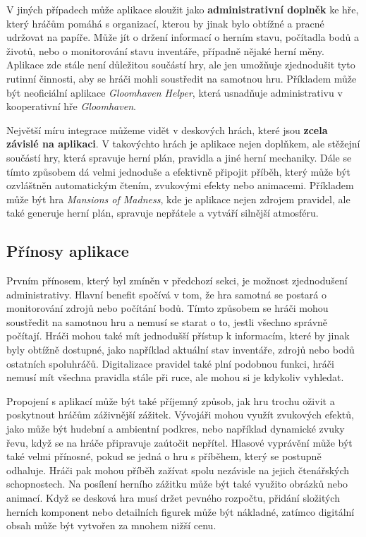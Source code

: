 V jiných případech může aplikace sloužit jako \textbf{administrativní doplněk} ke hře, který hráčům pomáhá s organizací, kterou by jinak bylo obtížné a pracné udržovat na papíře. Může jít o držení informací o herním stavu, počítadla bodů a životů, nebo o monitorování stavu inventáře, případně nějaké herní měny. Aplikace zde stále není důležitou součástí hry, ale jen umožňuje zjednodušit tyto rutinní činnosti, aby se hráči mohli soustředit na samotnou hru. Příkladem může být neoficiální aplikace \textit{Gloomhaven Helper}, která usnadňuje administrativu v kooperativní hře \textit{Gloomhaven}.

Největší míru integrace můžeme vidět v deskových hrách, které jsou \textbf{zcela závislé na aplikaci}. V takovýchto hrách je aplikace nejen doplňkem, ale stěžejní součástí hry, která spravuje herní plán, pravidla a jiné herní mechaniky. Dále se tímto způsobem dá velmi jednoduše a efektivně připojit příběh, který může být ozvláštněn automatickým čtením, zvukovými efekty nebo animacemi. Příkladem může být hra \textit{Mansions of Madness}, kde je aplikace nejen zdrojem pravidel, ale také generuje herní plán, spravuje nepřátele a vytváří silnější atmosféru.

\subsection{Přínosy aplikace}
\label{subsec:apps_app_benefits}

Prvním přínosem, který byl zmíněn v předchozí sekci, je možnost zjednodušení administrativy. Hlavní benefit spočívá v tom, že hra samotná se postará o monitorování zdrojů nebo počítání bodů. Tímto způsobem se hráči mohou soustředit na samotnou hru a nemusí se starat o to, jestli všechno správně počítají. Hráči mohou také mít jednodušší přístup k informacím, které by jinak byly obtížně dostupné, jako například aktuální stav inventáře, zdrojů nebo bodů ostatních spoluhráčů. Digitalizace pravidel také plní podobnou funkci, hráči nemusí mít všechna pravidla stále při ruce, ale mohou si je kdykoliv vyhledat.

Propojení s aplikací může být také příjemný způsob, jak hru trochu oživit a poskytnout hráčům záživnější zážitek. Vývojáři mohou využít zvukových efektů, jako může být hudební a ambientní podkres, nebo například dynamické zvuky řevu, když se na hráče připravuje zaútočit nepřítel. Hlasové vyprávění může být také velmi přínosné, pokud se jedná o hru s příběhem, který se postupně odhaluje. Hráči pak mohou příběh zažívat spolu nezávisle na jejich čtenářských schopnostech. Na posílení herního zážitku může být také využito obrázků nebo animací. Když se desková hra musí držet pevného rozpočtu, přidání složitých herních komponent nebo detailních figurek může být nákladné, zatímco digitální obsah může být vytvořen za mnohem nižší cenu.

